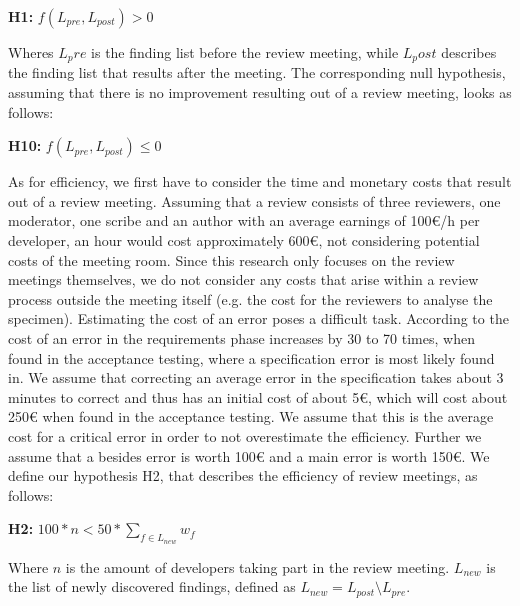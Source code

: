 \begin{center}
\textbf{H1:} $f(L_{pre}, L_{post}) > 0$
\end{center}

Wheres $L_pre$ is the finding list before the review meeting, while $L_post$ describes the finding list that results after the meeting.
The corresponding null hypothesis, assuming that there is no improvement resulting out of a review meeting, looks as follows:

\begin{center}
\textbf{H10:} $f(L_{pre}, L_{post}) \le 0$
\end{center}

As for efficiency, we first have to consider the time and monetary costs that result out of a review meeting. Assuming that a review consists of three reviewers, one moderator, one scribe and an author with an average earnings of 100€/h per developer, an hour would cost approximately 600€, not considering potential costs of the meeting room. Since this research only focuses on the review meetings themselves, we do not consider any costs that arise within a review process outside the meeting itself (e.g. the cost for the reviewers to analyse the specimen). Estimating the cost of an error poses a difficult task. According to \cite{stecklein2004error} the cost of an error in the requirements phase increases by 30 to 70 times, when found in the acceptance testing, where a specification error is most likely found in. We assume that correcting an average error in the specification takes about 3 minutes to correct and thus has an initial cost of about 5€, which will cost about 250€ when found in the acceptance testing.
We assume that this is the average cost for a critical error in order to not overestimate the efficiency. Further we assume that a besides error is worth 100€ and a main error is worth 150€. We define our hypothesis H2, that describes the efficiency of review meetings, as follows:

\begin{center}
\textbf{H2:} $100 * n < 50* \sum_{f \in L_{new}} w_f$
\end{center}

Where $n$ is the amount of developers taking part in the review meeting. $L_{new}$ is the list of newly discovered findings, defined as $L_{new} = L_{post} \setminus L_{pre}$. \\

